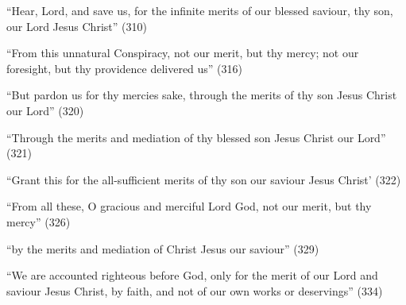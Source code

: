 \begin{compactitem}
				\item ``Hear, Lord, and save us, for the infinite merits of our blessed saviour, thy son, our Lord Jesus Christ'' (310)
				\item ``From this unnatural Conspiracy, not our merit, but thy mercy; not our foresight, but thy providence delivered us'' (316)
				\item ``But pardon us for thy mercies sake, through the merits of thy son Jesus Christ our Lord'' (320)
				\item ``Through the merits and mediation of thy blessed son Jesus Christ our Lord'' (321)
				\item ``Grant this for the all-sufficient merits of thy son our saviour Jesus Christ' (322)
				\item ``From all these, O gracious and merciful Lord God, not our merit, but thy mercy'' (326)
				\item ``by the merits and mediation of Christ Jesus our saviour'' (329)
				\item ``We are accounted righteous before God, only for the merit of our Lord and saviour Jesus Christ, by faith, and not of our own works or deservings'' (334)
			\end{compactitem} 